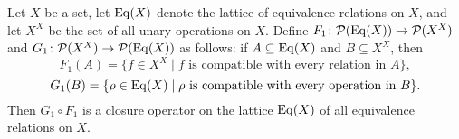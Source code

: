 \begin{example}
  Let $X$ be a set,
  let $\operatorname{Eq}(X)$ denote the lattice of equivalence relations on $X$, and let
  $X^X$ be the set of all unary operations on $X$.
  Define $F_1 \colon  \mathcal{P}(\operatorname{Eq}(X)) \to \mathcal{P}(X^X)$
  and $G_1 \colon \mathcal{P}(X^X) \to \mathcal{P}(\operatorname{Eq}(X))$ as follows:
  if $A \subseteq\operatorname{Eq}(X)$ and $B \subseteq X^X$, then
  \[
  F_1(A) = \{f \in X^X\mid f \text{ is compatible with every relation in $A$}\},
  \]
  \[
  G_1(B) = \{\rho \in \operatorname{Eq}(X) \mid \rho \text{ is compatible with every operation in $B$}\}.
  \]
  Then $G_1 \circ F_1$ is a closure operator on the lattice $\operatorname{Eq}(X)$
  of all equivalence relations on $X$.
\end{example}
\newcommand{\Luv}{\ensuremath{L_{u,v}}}
\newcommand{\bLuv}{\ensuremath{\mathbf{L}_{u,v}}}
\newcommand{\juv}{\ensuremath{\vee_{u,v}}}
\newcommand{\suv}{\ensuremath{\sigma_{u,v}}}
